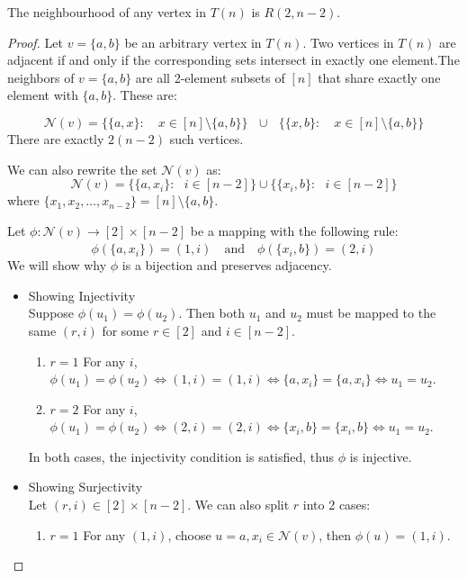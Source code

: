 \begin{proposition}
    The neighbourhood of any vertex in $T(n)$ is $R(2,n-2)$.
\end{proposition}
\begin{proof}
    Let $v = \{a,b\}$ be an arbitrary vertex in $T(n)$. Two vertices in $T(n)$ are adjacent if and only if the corresponding sets intersect in exactly one element.The neighbors of $v=\{a,b\}$ are all 2-element subsets of $[n]$ that share exactly one element with $\{a,b\}$. These are:

    \begin{equation*}
        \mathcal{N}(v)=\{\{a,x\}:\quad x\in[n] \setminus \{a,b\}\}\text{  }\cup\text{  }\{\{x,b\}:\quad x\in[n]\setminus\{a,b\}\}
    \end{equation*}
    There are exactly $2(n-2)$ such vertices.

    We can also rewrite the set $\mathcal{N}(v)$ as:
    \begin{equation*}
        \mathcal{N}(v)=\{\{a,x_i\}:\text{ }i\in[n-2]\}\cup\{\{x_i,b\}:\text{ }i\in[n-2]\}
    \end{equation*}
    where $\{x_1, x_2, \dots, x_{n-2}\} = [n]\setminus\{a,b\}$.

    Let $\phi:\mathcal{N}(v) \xrightarrow[]{} [2]\times[n-2]$ be a mapping with the following rule:
    \begin{equation*}
        \phi(\{a,x_i\}) = (1,i)\quad\text{and}\quad \phi(\{x_i,b\}) = (2,i)
    \end{equation*}
    We will show why $\phi$ is a bijection and preserves adjacency.
    \begin{itemize}
        \item Showing Injectivity\\
        Suppose $\phi(u_1)=\phi(u_2)$. Then both $u_1$ and $u_2$ must be mapped to the same $(r,i)$ for some $r\in[2]$ and $i\in[n-2]$. 
        \begin{enumerate}
            \item $r=1$
            For any $i$, $\phi(u_1)=\phi(u_2) \iff(1,i) = (1,i) \iff \{a,x_i\} = \{a,x_i\} \iff u_1=u_2$.
            \item $r=2$
            For any $i$, $\phi(u_1)=\phi(u_2) \iff(2,i) = (2,i) \iff \{x_i,b\} = \{x_i,b\} \iff u_1=u_2$.
        \end{enumerate}
        In both cases, the injectivity condition is satisfied, thus $\phi$ is injective.

        \item Showing Surjectivity\\
        Let $(r,i)\in [2]\times[n-2]$. We can also split $r$ into 2 cases:
        \begin{enumerate}
            \item $r=1$
            For any $(1,i)$, choose $u = {a,x_i}\in \mathcal{N}(v)$, then $\phi(u) = (1,i)$.


\end{enumerate}
\end{itemize}
\end{proof}
